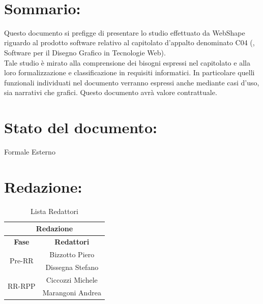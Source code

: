 \newpage


\begin{center} %
	\begin{Huge}	
				\textbf{\TITOLODOC}
			\\
	\end{Huge}
\end{center}
\parindent=18pt %
\section*{\LARGE Sommario:} %
Questo documento si prefigge di presentare lo studio effettuato da WebShape riguardo al prodotto software relativo al capitolato d'appalto denominato C04 (\blue{\ajax}, Software per il Disegno Grafico in Tecnologie Web).\\
Tale studio \`e mirato alla comprensione dei bisogni espressi nel capitolato e alla loro formalizzazione e classificazione in requisiti informatici. In particolare quelli funzionali individuati nel documento verranno espressi anche mediante casi d'uso, sia narrativi che grafici. Questo documento avr\`a valore contrattuale.

\section*{\LARGE Stato del documento:}
	Formale Esterno
\hangindent=0pt

\section*{\LARGE Redazione:}
	\begin{table}[!h]
		\begin{center}
			\begin{tabular}
				{|c|c|}
				\hline
				\multicolumn{2}{|c|}{ \textbf{Redazione} } \\
				\hline
				\textbf{Fase} & \textbf{Redattori} \\
				\hline
				\multirow{2}{*}{Pre-RR} & Bizzotto Piero\\
										& Dissegna Stefano\\
				\hline
				\multirow{2}{*}{RR-RPP} & Ciccozzi Michele\\
										& Marangoni Andrea\\
				\hline
			\end{tabular}
			\caption{Lista Redattori} %
			\label{tabredazione}
		\end{center}
	\end{table}	
